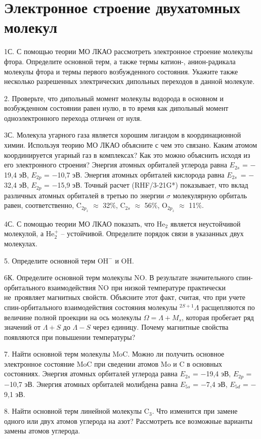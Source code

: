 \setmainfont{Noto Serif}
\setsansfont{Noto Sans}
\setmonofont{Noto Sans Mono}


\section{Электронное строение двухатомных молекул}

1С. С помощью теории МО ЛКАО рассмотреть электронное строение молекулы фтора. Определите основной терм, а также термы катион-, анион-радикала молекулы фтора и термы первого возбужденного состояния. Укажите также несколько разрешенных электрических дипольных переходов в данной молекуле.
\par
2. Проверьте, что дипольный момент молекулы водорода в основном и возбужденном состоянии равен нулю, в то время как дипольный момент одноэлектронного перехода отличен от нуля.
\par
3С. Молекула угарного газа является хорошим лигандом в координационной химии. Используя теорию МО ЛКАО объясните с чем это связано. Каким атомом координируется угарный газ в комплексах? Как это можно объяснить исходя из его электронного строения? Энергия атомных орбиталей углерода равна $E_{2s}$ = $-$19,4 эВ, $E_{2p}$ = $-$10,7 эВ. Энергия атомных орбиталей кислорода равна $E_{2s}$~= $-$32,4 эВ, $E_{2p}$ = $-$15,9 эВ. Точный расчет (RHF/3-21G*) показывает, что вклад различных атомных орбиталей в третью по энергии $\sigma$ молекулярную орбиталь равен, соответственно, $\text{C}_{2p_z}$ $\approx$ 32\%, $\text{C}_{2s}$ $\approx$ 56\%, $\text{O}_{2p_z}$ $\approx$ 11\%.
\par
4С. С помощью теории МО ЛКАО показать, что  $\text{He}_2$ является неустойчивой молекулой, а $\text{He}_2^{+}$ – устойчивой. Определите порядок связи в указанных двух молекулах.
\par
5. Определите основной терм $\text{OH}^-$ и $\text{OH}$.
\par
6К. Определите основной терм молекулы $\text{NO}$. В результате значительного спин-орбитального взаимодействия $\text{NO}$ при низкой температуре практически не~проявляет магнитных свойств. Объясните этот факт, считая, что при учете спин-орбитального взаимодействия состояния молекулы $^{2S+1}\Lambda$ расщепляются по величине полной проекции на ось молекулы $\Omega = \Lambda + M_s$, которая пробегает ряд значений от $\Lambda + S$ до $\Lambda - S$ через единицу. Почему магнитные свойства появляются при повышении температуры?
\par
7. Найти основной терм молекулы $\text{MoC}$. Можно ли получить основное электронное состояние $\text{MoC}$ при сведении атомов $\text{Mo}$ и $\text{C}$ в основных состояниях. Энергия атомных орбиталей углерода равна $E_{2s}$ = $-$19,4 эВ, $E_{2p}$ = $-$10,7 эВ. Энергия атомных орбиталей молибдена равна $E_{5s}$ = $-$7,4 эВ, $E_{5d}$ = $-$9,1 эВ.
\par
8. Найти основной терм линейной молекулы $\text{C}_3$. Что изменится при замене одного или двух атомов углерода на азот? Рассмотреть все возможные варианты замены атомов углерода. 
\par